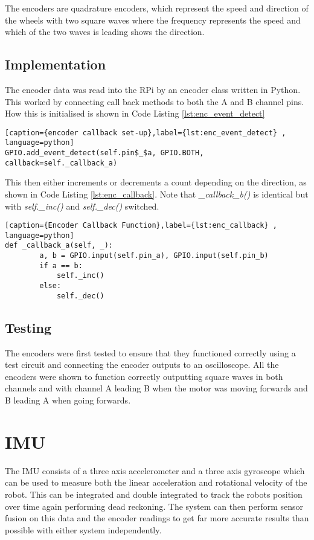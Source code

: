 The encoders are quadrature encoders, which represent the speed and direction of the wheels with two square waves where the frequency represents the speed and which of the two waves is leading shows the direction.

\subsection{Implementation}\label{elec/encoder/impl}

The encoder data was read into the RPi by an encoder class written in Python. This worked by connecting call back methods to both the A and B channel pins. How this is initialised is shown in Code Listing \ref{lst:enc_event_detect}


\begin{lstlisting}[caption={encoder callback set-up},label={lst:enc_event_detect} , language=python]
GPIO.add_event_detect(self.pin$_$a, GPIO.BOTH, callback=self._callback_a)
\end{lstlisting}

This then either increments or decrements a count depending on the direction, as shown in Code Listing \ref{lst:enc_callback}. Note that \textit{\_callback\_b()} is identical but with \textit{self.\_inc()} and \textit{self.\_dec()} switched.

\begin{lstlisting}[caption={Encoder Callback Function},label={lst:enc_callback} , language=python]
def _callback_a(self, _):
        a, b = GPIO.input(self.pin_a), GPIO.input(self.pin_b)
        if a == b:
            self._inc()
        else:
            self._dec()
\end{lstlisting}


\subsection{Testing}\label{elec/encoder/test}
The encoders were first tested to ensure that they functioned correctly using a test circuit and connecting the encoder outputs to an oscilloscope. All the encoders were shown to function correctly outputting square waves in both channels and with channel A leading B when the motor was moving forwards and B leading A when going forwards. 


\section{IMU}\label{elec/imu}
The IMU consists of a three axis accelerometer and a three axis gyroscope which can be used to measure both the linear acceleration and rotational velocity of the robot. This can be integrated and double integrated to track the robots position over time again performing dead reckoning. The system can then perform sensor fusion on this data and the encoder readings to get far more accurate results than possible with either system independently. 


